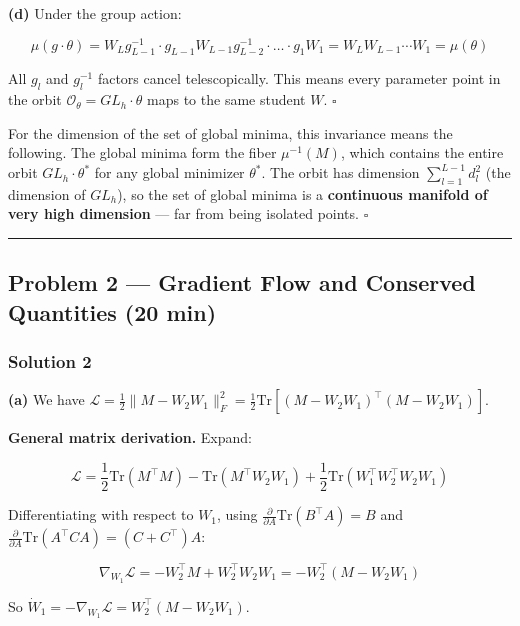 \documentclass[
]{article}
\begin{document}
\textbf{(d)} Under the group action:

\[\mu(g \cdot \theta) = W_L g_{L-1}^{-1} \cdot g_{L-1} W_{L-1} g_{L-2}^{-1} \cdot \ldots \cdot g_1 W_1 = W_L W_{L-1} \cdots W_1 = \mu(\theta)\]

All \(g_l\) and \(g_l^{-1}\) factors cancel telescopically. This means
every parameter point in the orbit
\(\mathcal{O}_\theta = GL_h \cdot \theta\) maps to the same student
\(W\). \(\square\)

For the dimension of the set of global minima,
this invariance means the following. The global minima form the fiber
\(\mu^{-1}(M)\), which contains
the entire orbit \(GL_h \cdot \theta^*\) for any global minimizer
\(\theta^*\). The orbit has dimension \(\sum_{l=1}^{L-1} d_l^2\) (the
dimension of \(GL_h\)), so the set of global minima is a
\textbf{continuous manifold of very high dimension} --- far from being
isolated points. \(\square\)

\begin{center}\rule{0.5\linewidth}{0.5pt}\end{center}

\subsection{Problem 2 --- Gradient Flow and Conserved Quantities (20
min)}\label{problem-2-gradient-flow-and-conserved-quantities-20-min}

\subsubsection{Solution 2}\label{solution-2}

\textbf{(a)} We have
\(\mathcal{L} = \frac{1}{2}\|M - W_2 W_1\|_F^2 = \frac{1}{2}\text{Tr}\left[(M - W_2 W_1)^\top(M - W_2 W_1)\right]\).

\textbf{General matrix derivation.} Expand:

\[\mathcal{L} = \frac{1}{2}\text{Tr}(M^\top M) - \text{Tr}(M^\top W_2 W_1) + \frac{1}{2}\text{Tr}(W_1^\top W_2^\top W_2 W_1)\]

Differentiating with respect to \(W_1\), using
\(\frac{\partial}{\partial A}\text{Tr}(B^\top A) = B\) and
\(\frac{\partial}{\partial A}\text{Tr}(A^\top C A) = (C + C^\top)A\):

\[\nabla_{W_1}\mathcal{L} = -W_2^\top M + W_2^\top W_2 W_1 = -W_2^\top(M - W_2 W_1)\]

So \(\dot{W}_1 = -\nabla_{W_1}\mathcal{L} = W_2^\top(M - W_2 W_1)\).
\end{document}
